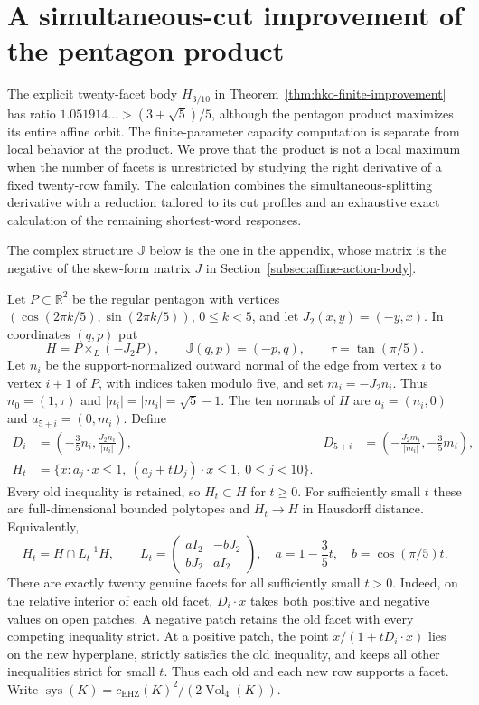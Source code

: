 \section{A simultaneous-cut improvement of the pentagon product}
\label{sec:hko-ascent}

The explicit twenty-facet body $H_{3/10}$ in
Theorem~\ref{thm:hko-finite-improvement} has ratio
$1.051914\ldots>(3+\sqrt5)/5$, although the pentagon product maximizes
its entire affine orbit. The finite-parameter capacity computation is
separate from local behavior at the product. We prove that the product is
not a local maximum when the number of facets is unrestricted by studying
the right derivative of a fixed twenty-row family. The calculation combines
the simultaneous-splitting derivative with a reduction tailored to its cut
profiles and an exhaustive exact calculation of the remaining
shortest-word responses.

The complex structure $\mathbb{J}$ below is the one in the appendix,
whose matrix is the negative of the skew-form matrix $J$ in
Section~\ref{subsec:affine-action-body}.

Let $P\subset\mathbb R^2$ be the regular pentagon with vertices
$(\cos(2\pi k/5),\sin(2\pi k/5))$, $0\leq k<5$, and let
$J_2(x,y)=(-y,x)$. In coordinates $(q,p)$ put
\[
 H=P\times_L(-J_2P),\qquad
 \mathbb{J}(q,p)=(-p,q),\qquad \tau=\tan(\pi/5).
\]
Let $n_i$ be the support-normalized outward normal of the edge from vertex
$i$ to vertex $i+1$ of $P$, with indices taken modulo five, and set
$m_i=-J_2n_i$. Thus $n_0=(1,\tau)$ and
$|n_i|=|m_i|=\sqrt5-1$. The ten normals of $H$ are
$a_i=(n_i,0)$ and $a_{5+i}=(0,m_i)$. Define
\begin{align}
 D_i&=\left(-\frac35n_i,\frac{J_2n_i}{|n_i|}\right),&
 D_{5+i}&=\left(-\frac{J_2m_i}{|m_i|},-\frac35m_i\right),
 \label{eq:ha-directions}\\
 H_t&=\{x:a_j\cdot x\leq1,\ (a_j+tD_j)\cdot x\leq1,
                         \ 0\leq j<10\}.\label{eq:ha-family}
\end{align}
Every old inequality is retained, so $H_t\subset H$ for $t\geq0$.
For sufficiently small $t$ these are full-dimensional bounded polytopes and
$H_t\to H$ in Hausdorff distance. Equivalently,
\[
 H_t=H\cap L_t^{-1}H,\qquad
 L_t=\begin{pmatrix}aI_2&-bJ_2\\ bJ_2&aI_2\end{pmatrix},\quad
 a=1-\frac35t,\quad b=\cos(\pi/5)t.
\]
There are exactly twenty genuine facets for all sufficiently small $t>0$.
Indeed, on the relative interior of each old facet, $D_i\cdot x$ takes
both positive and negative values on open patches. A negative patch retains
the old facet with every competing inequality strict. At a positive patch,
the point $x/(1+tD_i\cdot x)$ lies on the new hyperplane, strictly satisfies
the old inequality, and keeps all other inequalities strict for small $t$.
Thus each old and each new row supports a facet.
Write $\operatorname{sys}(K)=c_{\mathrm{EHZ}}(K)^2/
(2\operatorname{Vol}_4(K))$.

